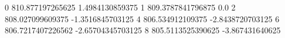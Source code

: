 0 810.877197265625 1.4984130859375
1 809.3787841796875 0.0
2 808.027099609375 -1.3516845703125
4 806.534912109375 -2.8438720703125
6 806.7217407226562 -2.65704345703125
8 805.5113525390625 -3.867431640625
